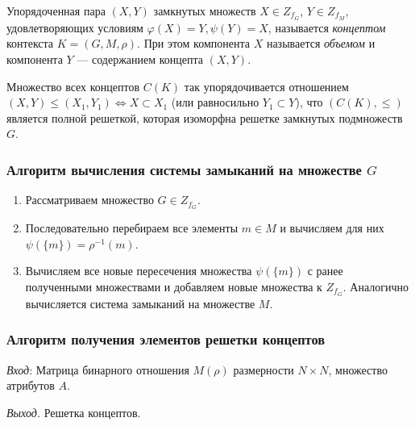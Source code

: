 \documentclass[bachelor, och, labwork]{shiza}
\begin{document}
Упорядоченная пара $(X,Y)$ замкнутых множеств $X\in Z_{f_G}$, $Y\in Z_{f_M}$,
удовлетворяющих условиям $\varphi(X)=Y, \psi(Y)=X$, называется \textit{концептом}
контекста $K=(G,M,\rho)$. При этом компонента $X$ называется \textit{объемом} и
компонента $Y$ --- содержанием концепта $(X,Y)$.

Множество всех концептов $C(K)$ так упорядочивается отношением $(X,Y)\le(X_1,Y_1) \Leftrightarrow X \subset X_1$
(или равносильно $Y_1 \subset Y$), что $(C(K),\le)$ является полной решеткой,
которая изоморфна решетке замкнутых подмножеств $G$.

\subsubsection{Алгоритм вычисления системы замыканий на множестве $G$}
\begin{enumerate}
    \item Рассматриваем множество $G \in Z_{f_G}$.
    \item Последовательно перебираем все элементы $m \in M$ и вычисляем для них $\psi(\{m\}) = \rho^{-1}(m)$.
    \item Вычисляем все новые пересечения множества $\psi(\{m\})$ с ранее полученными множествами и добавляем новые множества к $Z_{f_G}$. Аналогично вычисляется система замыканий на множестве $M$.
\end{enumerate}

\subsubsection{Алгоритм получения элементов решетки концептов}
\textit{Вход}: Матрица бинарного отношения $M(\rho)$ размерности $N\times N$,
множество атрибутов $A$.

\textit{Выход.} Решетка концептов.
\end{document}
